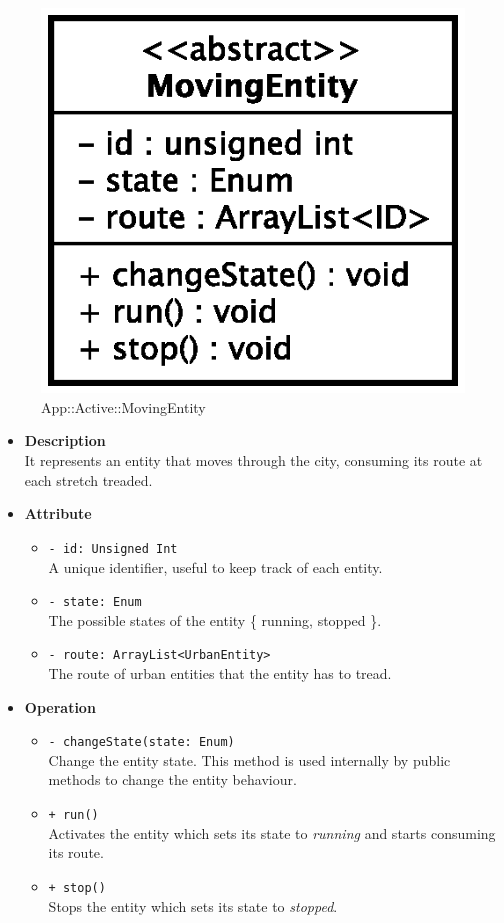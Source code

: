 \begin{figure}[h]
\centering
\includegraphics[scale=0.6,keepaspectratio]{sections/images/solution/moving_entity.eps}
\caption{App::Active::MovingEntity}
\label{fig:sd-app-movingentity}
\end{figure}
\begin{itemize}
  \item \textbf{Description} \\
    It represents an entity that moves through the city, consuming its 
route at each stretch treaded.
  \item \textbf{Attribute}
  \begin{itemize}
    \item \texttt{- id: Unsigned Int} \\
A unique identifier, useful to keep track of each entity.
    \item \texttt{- state: Enum} \\
The possible states of the entity \{ running, stopped \}.
    \item \texttt{- route: ArrayList<UrbanEntity>} \\
The route of urban entities that the entity has to tread.
  \end{itemize}
  \item \textbf{Operation}
  \begin{itemize}
    \item \texttt{- changeState(state: Enum)} \\
Change the entity state. This method is used internally by public methods to 
change the entity behaviour.
    \item  \texttt{+ run()} \\
Activates the entity which sets its state to \textit{running} and 
starts consuming its route.
    \item  \texttt{+ stop()} \\
Stops the entity which sets its state to \textit{stopped}.
  \end{itemize}
\end{itemize}
